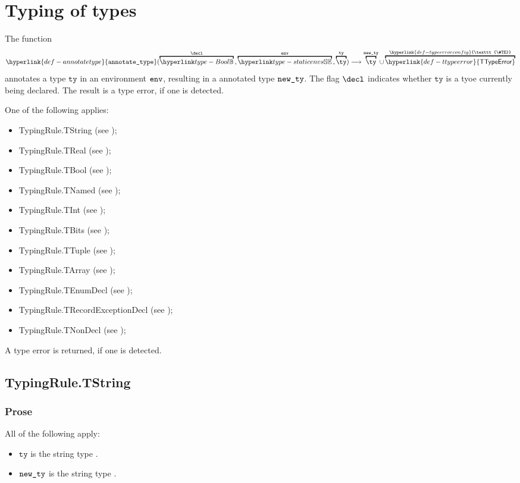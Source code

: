 \documentclass{book}
\newcommand\TTypeError[0]{\hyperlink{def-ttypeerror}{\textsf{TTypeError}}}
\newcommand\TypeErrorConfig[0]{\hyperlink{def-typeerrorconfig}{\texttt{\#TE}}}
\newcommand\annotatetype[1]{\hyperlink{def-annotatetype}{\texttt{annotate\_type}}(#1)}
\newcommand\tty[0]{\texttt{ty}}
\begin{document}
\chapter{Typing of types \label{chap:typingoftypes}}
\hypertarget{def-annotatetype}{}
The function
\[
  \annotatetype{\overname{\Bool}{\decl} \aslsep \overname{\staticenvs}{\tenv} \aslsep \overname{\ty}{\tty}}
  \aslto \overname{\ty}{\newty} \cup \overname{\TTypeError}{\TypeErrorConfig}
\]
annotates a type $\tty$ in an environment $\texttt{env}$, resulting in a
annotated type $\texttt{new\_ty}$.
The flag $\decl$ indicates whether $\tty$ is a tyoe currently being declared.
The result is a type error, if one is detected.

One of the following applies:
\begin{itemize}
  \item TypingRule.TString (see );
  \item TypingRule.TReal (see );
  \item TypingRule.TBool (see );
  \item TypingRule.TNamed (see );
  \item TypingRule.TInt (see );
  \item TypingRule.TBits (see );
  \item TypingRule.TTuple (see );
  \item TypingRule.TArray (see );
  \item TypingRule.TEnumDecl (see );
  \item TypingRule.TRecordExceptionDecl (see
    );
  \item TypingRule.TNonDecl (see );
\end{itemize}
A type error is returned, if one is detected.

\section{TypingRule.TString \label{sec:TypingRule.TString}}

\subsection{Prose}
All of the following apply:
\begin{itemize}
  \item $\tty$ is the string type \TString.
  \item $\texttt{new\_ty}$ is the string type \TString.
\end{itemize}
\end{document}
